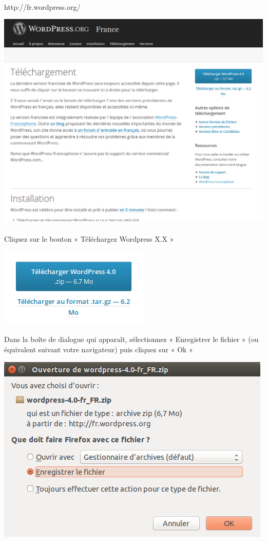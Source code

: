 \documentclass[10pt,a4paper]{article}
\begin{document}
\paragraph{}http://fr.wordpress.org/
\begin{center}
\includegraphics[scale=0.35]{img/0001.png}
\end{center}
\paragraph{}Cliquez sur le bouton « Téléchargez Wordpress X.X »
\begin{center}
\includegraphics[scale=0.7]{img/0002.png}
\end{center}
\paragraph{}Dans la boîte de dialogue qui apparaît, sélectionnez « Enregistrer le fichier » (ou équivalent suivant votre navigateur) puis cliquez sur « Ok »
\begin{center}
\includegraphics[scale=0.5]{img/0003.png}
\end{center}
\end{document}
